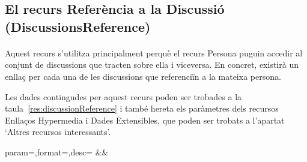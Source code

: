 \subsection{El recurs Referència a la Discussió (DiscussionsReference)}

    \paragraph{}
    Aquest recurs s'utilitza principalment perquè el recurs Persona puguin accedir al conjunt de discussions que tracten sobre ella i viceversa. En concret, existirà un enllaç per cada una de les discussions que referenciïn a la mateixa persona.

    Les dades contingudes per aquest recurs poden ser trobades a la taula~\ref{res:discussionReference} i també hereta els paràmetres dels recursos Enllaços Hypermedia i Dades Extensibles, que poden ser trobats a l'apartat `Altres recursos interessants'.

    \begin{center}
             {param=\param,format=\format,desc=\desc}
             {\param&\format&\desc}
     \end{center}
